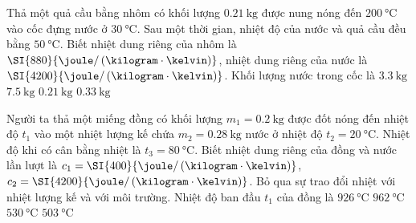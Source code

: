 \begin{ex}
	Thả một quả cầu bằng nhôm có khối lượng $\SI{0.21}{\kilogram}$ được nung nóng đến $\SI{200}{\celsius}$ vào cốc đựng nước ở $\SI{30}{\celsius}$. Sau một thời gian, nhiệt độ của nước và quả cầu đều bằng $\SI{50}{\celsius}$. Biết nhiệt dung riêng của nhôm là $\SI{880}{\joule/\left(\kilogram\cdot\kelvin\right)}$, nhiệt dung riêng của nước là $\SI{4200}{\joule/\left(\kilogram\cdot\kelvin\right)}$. Khối lượng nước trong cốc là	
	\choice
	{$\SI{3.3}{\kilogram}$}
	{$\SI{7.5}{\kilogram}$}
	{$\SI{0.21}{\kilogram}$}
	{\True $\SI{0.33}{\kilogram}$}
	
\end{ex}
\begin{ex}
	Người ta thả một miếng đồng có khối lượng $m_1=\SI{0.2}{\kilogram}$ được đốt nóng đến nhiệt độ $t_1$ vào một nhiệt lượng kế chứa $m_2=\SI{0.28}{\kilogram}$ nước ở nhiệt độ $t_2=\SI{20}{\celsius}$. Nhiệt độ khi có cân bằng nhiệt là $t_3=\SI{80}{\celsius}$. Biết nhiệt dung riêng của đồng và nước lần lượt là $c_1=\SI{400}{\joule/\left(\kilogram\cdot\kelvin\right)}$, $c_2=\SI{4200}{\joule/\left(\kilogram\cdot\kelvin\right)}$. Bỏ qua sự trao đổi nhiệt với nhiệt lượng kế và với môi trường. Nhiệt độ ban đầu $t_1$ của đồng là
	\choice
	{$\SI{926}{\celsius}$}
	{\True $\SI{962}{\celsius}$}
	{$\SI{530}{\celsius}$}
	{$\SI{503}{\celsius}$}
\end{ex}
